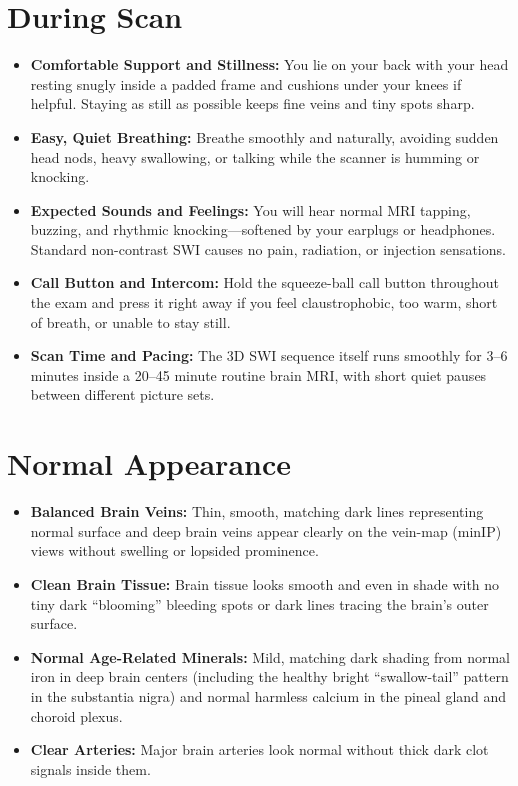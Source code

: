 \section{During Scan}

\begin{itemize}
    \item \textbf{Comfortable Support and Stillness:} You lie on your back with your head resting snugly inside a padded frame and cushions under your knees if helpful. Staying as still as possible keeps fine veins and tiny spots sharp.
    \item \textbf{Easy, Quiet Breathing:} Breathe smoothly and naturally, avoiding sudden head nods, heavy swallowing, or talking while the scanner is humming or knocking.
    \item \textbf{Expected Sounds and Feelings:} You will hear normal MRI tapping, buzzing, and rhythmic knocking---softened by your earplugs or headphones. Standard non-contrast SWI causes no pain, radiation, or injection sensations.
    \item \textbf{Call Button and Intercom:} Hold the squeeze-ball call button throughout the exam and press it right away if you feel claustrophobic, too warm, short of breath, or unable to stay still.
    \item \textbf{Scan Time and Pacing:} The 3D SWI sequence itself runs smoothly for 3--6 minutes inside a 20--45 minute routine brain MRI, with short quiet pauses between different picture sets.
\end{itemize}

\section{Normal Appearance}

\begin{itemize}
    \item \textbf{Balanced Brain Veins:} Thin, smooth, matching dark lines representing normal surface and deep brain veins appear clearly on the vein-map (minIP) views without swelling or lopsided prominence.
    \item \textbf{Clean Brain Tissue:} Brain tissue looks smooth and even in shade with no tiny dark ``blooming'' bleeding spots or dark lines tracing the brain's outer surface.
    \item \textbf{Normal Age-Related Minerals:} Mild, matching dark shading from normal iron in deep brain centers (including the healthy bright ``swallow-tail'' pattern in the substantia nigra) and normal harmless calcium in the pineal gland and choroid plexus.
    \item \textbf{Clear Arteries:} Major brain arteries look normal without thick dark clot signals inside them.
\end{itemize}

